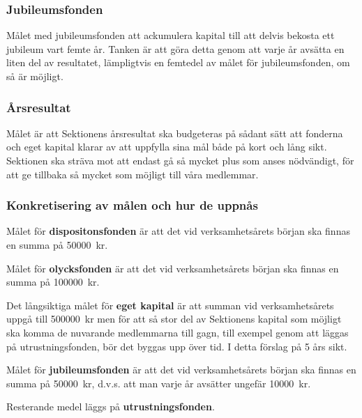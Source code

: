 \documentclass[10pt]{article}
\begin{document}
\subsubsection*{Jubileumsfonden}
Målet med jubileumsfonden att ackumulera kapital till att delvis bekosta ett jubileum vart femte år. Tanken är att göra detta genom att varje år avsätta en liten del av resultatet, lämpligtvis en femtedel av målet för jubileumsfonden, om så är möjligt.

\subsubsection*{Årsresultat}
Målet är att Sektionens årsresultat ska budgeteras på sådant sätt att fonderna och eget kapital klarar av att uppfylla sina mål både på kort och lång sikt. Sektionen ska sträva mot att endast gå så mycket plus som anses nödvändigt, för att ge tillbaka så mycket som möjligt till våra medlemmar.

\newpage
\subsubsection*{Konkretisering av målen och hur de uppnås}
Målet för \textbf{dispositonsfonden} är att det vid verksamhetsårets början ska finnas en summa på \SI{50000}{kr}.

Målet för \textbf{olycksfonden} är att det vid verksamhetsårets början ska finnas en summa på \SI{100000}{kr}.

Det långsiktiga målet för \textbf{eget kapital} är att summan vid verksamhetsårets uppgå till \SI{500000}{kr} men för att så stor del av Sektionens kapital som möjligt ska komma de nuvarande medlemmarna till gagn, till exempel genom att läggas på utrustningsfonden, bör det byggas upp över tid. I detta förslag på 5 års sikt.

Målet för \textbf{jubileumsfonden} är att det vid verksamhetsårets början ska finnas en summa på \SI{50000}{kr}, d.v.s. att man varje år avsätter ungefär \SI{10000}{kr}.

Resterande medel läggs på \textbf{utrustningsfonden}.
\end{document}
